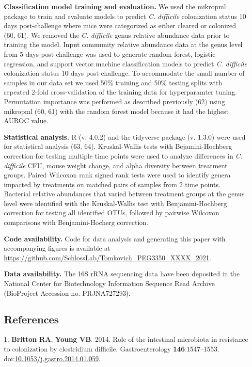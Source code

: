 \documentclass[
  11pt,
]{article}
\begin{document}
\textbf{Classification model training and evaluation.} We used the
mikropml package to train and evaluate models to predict \emph{C.
difficile} colonization status 10 days post-challenge where mice were
categorized as either cleared or colonized (60, 61). We removed the
\emph{C. difficile} genus relative abundance data prior to training the
model. Input community relative abundance data at the genus level from 5
days post-challenge was used to generate random forest, logistic
regression, and support vector machine classification models to predict
\emph{C. difficile} colonization status 10 days post-challenge. To
accommodate the small number of samples in our data set we used 50\%
training and 50\% testing splits with repeated 2-fold cross-validation
of the training data for hyperparamter tuning. Permutation importance
was performed as described previously (62) using mikropml (60, 61) with
the random forest model because it had the highest AUROC value.

\textbf{Statistical analysis.} R (v. 4.0.2) and the tidyverse package
(v. 1.3.0) were used for statistical analysis (63, 64). Kruskal-Wallis
tests with Bejamini-Hochberg correction for testing multiple time points
were used to analyze differences in \emph{C. difficile} CFU, mouse
weight change, and alpha diversity between treatment groups. Paired
Wilcoxon rank signed rank tests were used to identify genera impacted by
treatments on matched pairs of samples from 2 time points. Bacterial
relative abundances that varied between treatment groups at the genus
level were identified with the Kruskal-Wallis test with
Benjamini-Hochberg correction for testing all identified OTUs, followed
by pairwise Wilcoxon comparisons with Benjamini-Hocherg correction.

\textbf{Code availability.} Code for data analysis and generating this
paper with accompanying figures is available at
\url{https://github.com/SchlossLab/Tomkovich_PEG3350_XXXX_2021}.

\textbf{Data availability.} The 16S rRNA sequencing data have been
deposited in the National Center for Biotechnology Information Sequence
Read Archive (BioProject Accession no. PRJNA727293).

\newpage

\hypertarget{references}{%
\subsection{References}\label{references}}

\hypertarget{refs}{}
\leavevmode\hypertarget{ref-Britton2014}{}%
1. \textbf{Britton RA}, \textbf{Young VB}. 2014. Role of the intestinal
microbiota in resistance to colonization by clostridium difficile.
Gastroenterology \textbf{146}:1547--1553.
doi:\href{https://doi.org/10.1053/j.gastro.2014.01.059}{10.1053/j.gastro.2014.01.059}.
\end{document}

